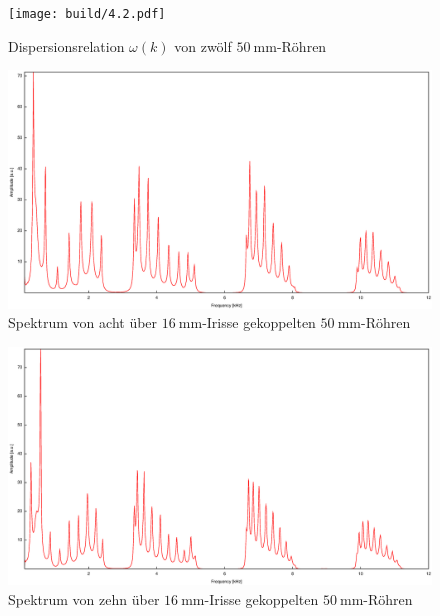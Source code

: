 \begin{figure}
\centering
\texttt{[image: build/4.2.pdf]}
\caption{Dispersionsrelation $\omega(k)$ von zwölf $\SI{50}{\milli\meter}$-Röhren}
\label{fig:w_k}
\end{figure}
\begin{figure}
\centering
\includegraphics[width=\linewidth-60pt,height=\textheight-60pt,keepaspectratio]{FP-V23data/4.3_400mm_16mm.eps}
\caption{Spektrum von acht über $\SI{16}{\milli\meter}$-Irisse gekoppelten $\SI{50}{\milli\meter}$-Röhren}
\label{fig:8_50_16}
\end{figure}
\begin{figure}
\centering
\includegraphics[width=\linewidth-60pt,height=\textheight-60pt,keepaspectratio]{FP-V23data/4.4_500mm_16mm.eps}
\caption{Spektrum von zehn über $\SI{16}{\milli\meter}$-Irisse gekoppelten $\SI{50}{\milli\meter}$-Röhren}
\label{fig:10_50_16}
\end{figure}
